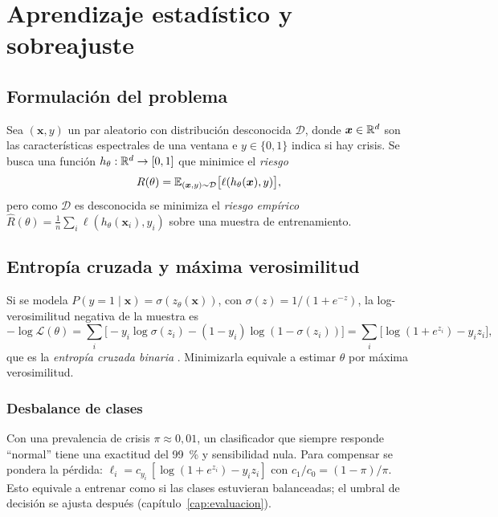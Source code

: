 \chapter{Aprendizaje estadístico y sobreajuste}
\label{cap:aprendizaje}

\section{Formulación del problema}

Sea $(\bm x, y)$ un par aleatorio con distribución desconocida $\mathcal{D}$, donde $\bm x\in\mathbb{R}^d$ son las características espectrales de una ventana e $y\in\{0,1\}$ indica si hay crisis. Se busca una función $h_\theta:\mathbb{R}^d\to[0,1]$ que minimice el \emph{riesgo}
\begin{equation}
R(\theta) = \mathbb{E}_{(\bm x,y)\sim\mathcal D}\big[\ell(h_\theta(\bm x), y)\big],
\end{equation}
pero como $\mathcal D$ es desconocida se minimiza el \emph{riesgo empírico} $\hat R(\theta) = \frac1n\sum_i \ell(h_\theta(\bm x_i), y_i)$ sobre una muestra de entrenamiento.

\section{Entropía cruzada y máxima verosimilitud}

Si se modela $P(y=1\mid\bm x) = \sigma(z_\theta(\bm x))$, con $\sigma(z) = 1/(1+e^{-z})$, la log-verosimilitud negativa de la muestra es
\begin{equation}
-\log\mathcal{L}(\theta) = \sum_i \Big[-y_i\log\sigma(z_i) - (1-y_i)\log(1-\sigma(z_i))\Big] = \sum_i\Big[\log(1+e^{z_i}) - y_i z_i\Big],
\end{equation}
que es la \emph{entropía cruzada binaria} \parencite[cap.~5]{bishop2024}. Minimizarla equivale a estimar $\theta$ por máxima verosimilitud.

\subsection{Desbalance de clases}

Con una prevalencia de crisis $\pi\approx 0{,}01$, un clasificador que siempre responde ``normal'' tiene una exactitud del 99~\% y sensibilidad nula. Para compensar se pondera la pérdida: $\ell_i = c_{y_i}\,[\log(1+e^{z_i}) - y_i z_i]$ con $c_1/c_0 = (1-\pi)/\pi$. Esto equivale a entrenar como si las clases estuvieran balanceadas; el umbral de decisión se ajusta después (capítulo~\ref{cap:evaluacion}).

